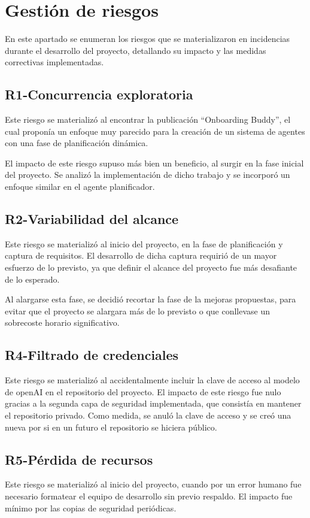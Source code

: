 \section{Gestión de riesgos}
En este apartado se enumeran los riesgos que se materializaron en incidencias durante el desarrollo del proyecto, detallando su impacto y las medidas correctivas implementadas.

\subsection{R1-Concurrencia exploratoria}
Este riesgo se materializó al encontrar la publicación ``Onboarding Buddy'', el cual proponía un enfoque muy parecido para la creación de un sistema de agentes con una fase de planificación dinámica. 

El impacto de este riesgo supuso más bien un beneficio, al surgir en la fase inicial del proyecto. Se analizó la implementación de dicho trabajo y se incorporó un enfoque similar en el agente planificador. 

\subsection{R2-Variabilidad del alcance}
Este riesgo se materializó al inicio del proyecto, en la fase de planificación y captura de requisitos. El desarrollo de dicha captura requirió de un mayor esfuerzo de lo previsto, ya que definir el alcance del proyecto fue más desafiante de lo esperado. 

Al alargarse esta fase, se decidió recortar la fase de la mejoras propuestas, para evitar que el proyecto se alargara más de lo previsto o que conllevase un sobrecoste horario significativo.

\subsection{R4-Filtrado de credenciales}
Este riesgo se materializó al accidentalmente incluir la clave de acceso al modelo de openAI en el repositorio del proyecto. El impacto de este riesgo fue nulo gracias a la segunda capa de seguridad implementada, que consistía en mantener el repositorio privado. Como medida, se anuló la clave de acceso y se creó una nueva por si en un futuro el repositorio se hiciera público.

\subsection{R5-Pérdida de recursos}
Este riesgo se materializó al inicio del proyecto, cuando por un error humano fue necesario formatear el equipo de desarrollo sin previo respaldo. El impacto fue mínimo por las copias de seguridad periódicas.

